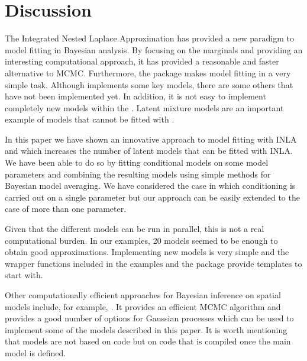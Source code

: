 \documentclass[article]{jss}
\begin{document}
%
%



\section{Discussion} \label{sec:disc}

The Integrated Nested Laplace Approximation has provided a new paradigm to
model fitting in Bayesian analysis. By focusing on the marginals and providing
an interesting computational approach, it has provided a reasonable and faster
alternative to MCMC. Furthermore, the  package makes model fitting
in  a very simple task.  Although  implements some key
models, there are some others that have not been implemented yet.
In addition, it is not easy to implement completely new models within the
. Latent mixture models are an important example of models that
cannot be fitted with .

In this paper we have shown an innovative approach to model fitting with INLA
and  which increases the number of latent models that can be fitted
with INLA. We have been able to do so by fitting conditional models on some
model parameters and combining the resulting models using simple methods for
Bayesian model averaging. We have considered the case in which conditioning is
carried out on a single parameter but our approach can be easily extended to the
case of more than one parameter.

Given that the different models can be run in parallel, this is not a real
computational burden. In our examples, 20 models seemed to be enough to obtain
good approximations. Implementing new models is very simple and the wrapper
functions included in the examples and the  package provide
templates to start with.

Other computationally efficient approaches for Bayesian inference on spatial 
models include, for example,  \citep{stan-software:2013}.
It provides an efficient MCMC algorithm and provides a good number of options
for Gaussian processes which can be used to implement some of the models
described in this paper. It is worth mentioning that  models are not
based on  code but on  code that is compiled once the main
model is defined.
\end{document}
